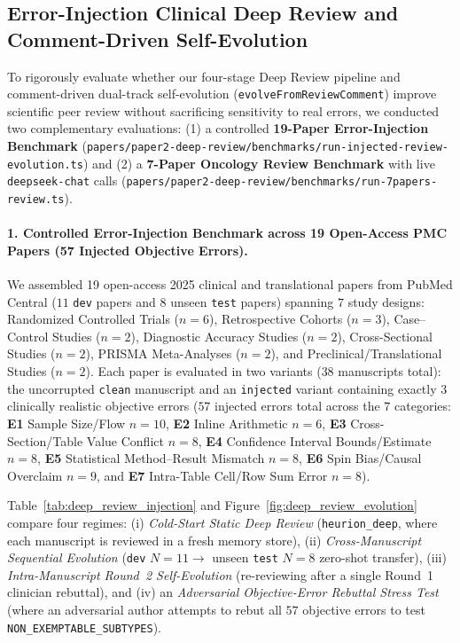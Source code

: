 \documentclass[11pt,a4paper]{article}
\begin{document}
\subsection{Error-Injection Clinical Deep Review and Comment-Driven Self-Evolution}
\label{sec:eval_deep_review}
To rigorously evaluate whether our four-stage Deep Review pipeline and comment-driven dual-track self-evolution (\texttt{evolveFromReviewComment}) improve scientific peer review without sacrificing sensitivity to real errors, we conducted two complementary evaluations: (1) a controlled \textbf{19-Paper Error-Injection Benchmark} (\texttt{papers/paper2-deep-review/benchmarks/run-injected-review-evolution.ts}) and (2) a \textbf{7-Paper Oncology Review Benchmark} with live \texttt{deepseek-chat} calls (\texttt{papers/paper2-deep-review/benchmarks/run-7papers-review.ts}).

\paragraph{1. Controlled Error-Injection Benchmark across 19 Open-Access PMC Papers (57 Injected Objective Errors).}
We assembled 19 open-access 2025 clinical and translational papers from PubMed Central ($11$ \texttt{dev} papers and $8$ unseen \texttt{test} papers) spanning $7$ study designs: Randomized Controlled Trials ($n=6$), Retrospective Cohorts ($n=3$), Case--Control Studies ($n=2$), Diagnostic Accuracy Studies ($n=2$), Cross-Sectional Studies ($n=2$), PRISMA Meta-Analyses ($n=2$), and Preclinical/Translational Studies ($n=2$). Each paper is evaluated in two variants ($38$ manuscripts total): the uncorrupted \texttt{clean} manuscript and an \texttt{injected} variant containing exactly $3$ clinically realistic objective errors ($57$ injected errors total across the $7$ categories: \textbf{E1} Sample Size/Flow $n=10$, \textbf{E2} Inline Arithmetic $n=6$, \textbf{E3} Cross-Section/Table Value Conflict $n=8$, \textbf{E4} Confidence Interval Bounds/Estimate $n=8$, \textbf{E5} Statistical Method--Result Mismatch $n=8$, \textbf{E6} Spin Bias/Causal Overclaim $n=9$, and \textbf{E7} Intra-Table Cell/Row Sum Error $n=8$).

Table~\ref{tab:deep_review_injection} and Figure~\ref{fig:deep_review_evolution} compare four regimes: (i) \emph{Cold-Start Static Deep Review} (\texttt{heurion\_deep}, where each manuscript is reviewed in a fresh memory store), (ii) \emph{Cross-Manuscript Sequential Evolution} (\texttt{dev} $N=11 \to$ unseen \texttt{test} $N=8$ zero-shot transfer), (iii) \emph{Intra-Manuscript Round~2 Self-Evolution} (re-reviewing after a single Round~1 clinician rebuttal), and (iv) an \emph{Adversarial Objective-Error Rebuttal Stress Test} (where an adversarial author attempts to rebut all $57$ objective errors to test \texttt{NON\_EXEMPTABLE\_SUBTYPES}).
\end{document}

